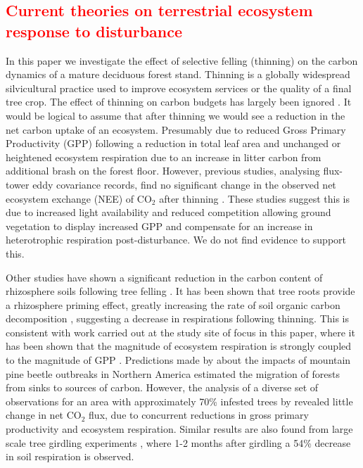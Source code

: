 \documentclass[11pt]{article}
\begin{document}
\subsection{\textcolor{red}{Current theories on terrestrial ecosystem response to disturbance}}
In this paper we investigate the effect of selective felling (thinning) on the carbon dynamics of a mature deciduous forest stand. Thinning is a globally widespread silvicultural practice used to improve ecosystem services or the quality of a final tree crop. The effect of thinning on carbon budgets has largely been ignored \citep{JGRG:JGRG779}. It would be logical to assume that after thinning we would see a reduction in the net carbon uptake of an ecosystem. Presumably due to reduced Gross Primary Productivity (GPP) following a reduction in total leaf area and unchanged or heightened ecosystem respiration due to an increase in litter carbon from additional brash on the forest floor. However, previous studies, analysing flux-tower eddy covariance records, find no significant change in the observed net ecosystem exchange (NEE) of CO\(_{2}\) after thinning \citep{vesala2005effect, wilkinson2015effects, moreaux2011paired, dore2012recovery}. These studies suggest this is due to increased light availability and reduced competition allowing ground vegetation to display increased GPP and compensate for an increase in heterotrophic respiration post-disturbance. We do not find evidence to support this. 

Other studies have shown a significant reduction in the carbon content of rhizosphere soils following tree felling \citep{Hernesmaa2005777}. It has been shown that tree roots provide a rhizosphere priming effect, greatly increasing the rate of soil organic carbon decomposition \citep{ELE:ELE1095}, suggesting a decrease in respirations following thinning. This is consistent with work carried out at the study site of focus in this paper, where it has been shown that the magnitude of ecosystem respiration is strongly coupled to the magnitude of GPP \citep{heinemeyer2012exploring}. Predictions made by \citet{kurz2008mountain} about the impacts of mountain pine beetle outbreaks in Northern America estimated the migration of forests from sinks to sources of carbon. However, the analysis of a diverse set of observations for an area with approximately 70\% infested trees by \citet{ELE:ELE12097} revealed little change in net CO\(_{2}\) flux, due to concurrent reductions in gross primary productivity and ecosystem respiration. Similar results are also found from large scale tree girdling experiments \citep{hogberg2001large},  where 1-2 months after girdling a 54\% decrease in soil respiration is observed.
\end{document}
